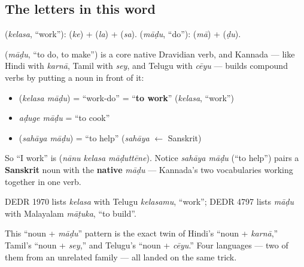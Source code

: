 \subsection*{The letters in this word}
\textbf{} (\emph{kelasa}, \textquotedblleft{}work\textquotedblright{}): \textbf{} (\emph{ke}) + \textbf{} (\emph{la}) + \textbf{} (\emph{sa}). \textbf{} (\emph{māḍu}, \textquotedblleft{}do\textquotedblright{}): \textbf{} (\emph{mā}) + \textbf{} (\emph{ḍu}).

\begin{cousinweb}
\textbf{} (\emph{māḍu}, \textquotedblleft{}to do, to make\textquotedblright{}) is a core native Dravidian verb, and Kannada — like Hindi with \emph{karnā}, Tamil with \emph{sey}, and Telugu with \emph{cēyu} — builds compound verbs by putting a noun in front of it:

\begin{itemize}
\raggedright
  \item \textbf{ } (\emph{kelasa māḍu}) = \textquotedblleft{}work-do\textquotedblright{} = \textquotedblleft{}\textbf{to work}\textquotedblright{} (\emph{kelasa}, \textquotedblleft{}work\textquotedblright{})
  \item \emph{aḍuge māḍu} = \textquotedblleft{}to cook\textquotedblright{}
  \item \textbf{ } (\emph{sahāya māḍu}) = \textquotedblleft{}to help\textquotedblright{} (\emph{sahāya} $\leftarrow$ Sanskrit)
\end{itemize}

So \textquotedblleft{}I work\textquotedblright{} is \textbf{  } (\emph{nānu kelasa māḍuttēne}). Notice \emph{sahāya māḍu} (\textquotedblleft{}to help\textquotedblright{}) pairs a \textbf{Sanskrit} noun with the \textbf{native} \emph{māḍu} — Kannada's two vocabularies working together in one verb.

DEDR 1970 lists \emph{kelasa} with Telugu \emph{kelasamu}, \textquotedblleft{}work\textquotedblright{}; DEDR 4797 lists \emph{māḍu} with Malayalam \emph{māṭuka}, \textquotedblleft{}to build\textquotedblright{}.
\end{cousinweb}

\begin{grammarlens}[title={Grammar Lens: noun + \kn{ಮಾಡು} = a new verb}]
This \textquotedblleft{}noun + \emph{māḍu}\textquotedblright{} pattern is the exact twin of Hindi's \textquotedblleft{}noun + \emph{karnā},\textquotedblright{} Tamil's \textquotedblleft{}noun + \emph{sey},\textquotedblright{} and Telugu's \textquotedblleft{}noun + \emph{cēyu}.\textquotedblright{} Four languages — two of them from an unrelated family — all landed on the same trick.
\end{grammarlens}

